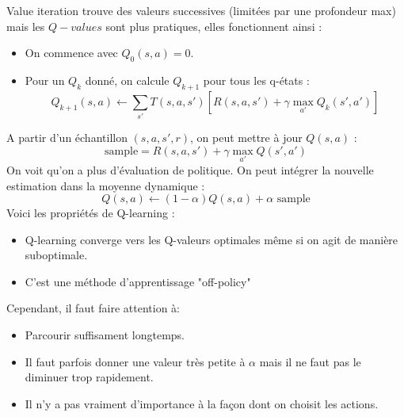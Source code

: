 \label{ssubsub:q_learning}
Value iteration trouve des valeurs successives (limitées par une profondeur max) mais les $Q-values$ sont plus pratiques, 
elles fonctionnent ainsi :
\begin{itemize}[label=\textbullet]
    \item On commence avec $Q_0(s,a)=0$.
    \item Pour un $Q_k$ donné, on calcule $Q_{k+1}$ pour tous les q-états :
    \begin{equation*}
        Q_{k+1}(s,a)\leftarrow\sum_{s'}T(s,a,s')[R(s,a,s')+\gamma\max\limits_{a'}Q_k(s',a')]
    \end{equation*}
\end{itemize}
A partir d'un échantillon $(s,a,s',r)$, on peut mettre à jour $Q(s,a)$ :
\begin{equation*}
    \text{sample} = R(s,a,s')+\gamma\max\limits_{a'}Q(s',a')
\end{equation*}
On voit qu'on a plus d'évaluation de politique. On peut intégrer la nouvelle estimation dans la moyenne dynamique :
\begin{equation*}
    Q(s,a)\leftarrow (1-\alpha)Q(s,a)+\alpha\text{ sample}
\end{equation*}
Voici les propriétés de Q-learning :
\begin{itemize}[label=\textbullet]
    \item Q-learning converge vers les Q-valeurs optimales même si on agit de manière suboptimale.
    \item C'est une méthode d'apprentissage "off-policy"
\end{itemize}
Cependant, il faut faire attention à:
\begin{itemize}[label=\textbullet]
    \item Parcourir suffisament longtemps.
    \item Il faut parfois donner une valeur très petite à $\alpha$ mais il ne faut pas le diminuer trop rapidement.
    \item Il n'y a pas vraiment d'importance à la façon dont on choisit les actions.
\end{itemize}